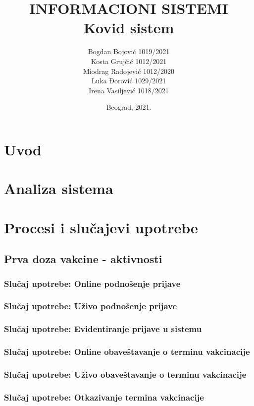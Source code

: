 \documentclass[titlepage]{article}
\title{INFORMACIONI SISTEMI\\Kovid sistem}
\author{
Bogdan Bojović 1019/2021\\
Kosta Grujčić 1012/2021\\
Miodrag Radojević 1012/2020\\
Luka Đorović 1029/2021\\
Irena Vasiljević 1018/2021
}
\date{Beograd, 2021.}
\begin{document}
\maketitle
\tableofcontents

\newpage

\section{Uvod}

\section{Analiza sistema}

\section{Procesi i slučajevi upotrebe}


\subsection{Prva doza vakcine - aktivnosti}
\subsubsection{Slučaj upotrebe: Online podnošenje prijave}
\subsubsection{Slučaj upotrebe: Uživo podnošenje prijave}
\subsubsection{Slučaj upotrebe: Evidentiranje prijave u sistemu}
\subsubsection{Slučaj upotrebe: Online obaveštavanje o terminu vakcinacije}
\subsubsection{Slučaj upotrebe: Uživo obaveštavanje o terminu vakcinacije}
\subsubsection{Slučaj upotrebe: Otkazivanje termina vakcinacije}
\end{document}
